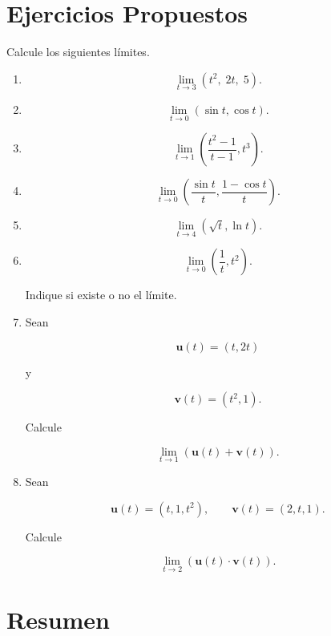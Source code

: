 \section*{Ejercicios Propuestos}

Calcule los siguientes límites.

\begin{enumerate}

\item

\[
\lim_{t\to3}
(t^2,\;2t,\;5).
\]

\item

\[
\lim_{t\to0}
(\sin t,\cos t).
\]

\item

\[
\lim_{t\to1}
\left(
\frac{t^2-1}{t-1},
t^3
\right).
\]

\item

\[
\lim_{t\to0}
\left(
\frac{\sin t}{t},
\frac{1-\cos t}{t}
\right).
\]

\item

\[
\lim_{t\to4}
(\sqrt{t},\ln t).
\]

\item

\[
\lim_{t\to0}
\left(
\frac1t,
t^2
\right).
\]

Indique si existe o no el límite.

\item

Sean

\[
\mathbf{u}(t)=
(t,2t)
\]

y

\[
\mathbf{v}(t)=
(t^2,1).
\]

Calcule

\[
\lim_{t\to1}
(\mathbf{u}(t)+\mathbf{v}(t)).
\]

\item

Sean

\[
\mathbf{u}(t)=
(t,1,t^2),
\qquad
\mathbf{v}(t)=
(2,t,1).
\]

Calcule

\[
\lim_{t\to2}
(\mathbf{u}(t)\cdot\mathbf{v}(t)).
\]

\end{enumerate}

\section*{Resumen}

